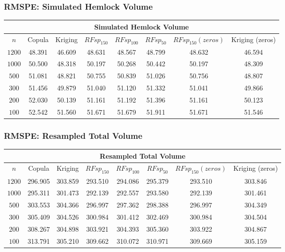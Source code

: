 \documentclass{beamer}
\begin{document}
\begin{frame}
	\frametitle{RMSPE: Simulated Hemlock Volume}
	\begin{center}
		\begin{tabular}{|| c | c c c c c c c ||}
		\hline
		\multicolumn{8}{||c||}{Simulated Hemlock Volume} \\
		\hline
		$n$ & Copula & Kriging & $RFsp_{150}$ & $RFsp_{100}$ & $RFsp_{50}$ & $RFsp_{150}(zeros)$ & Kriging (zeros) \\ [.5ex] 
		\hline\hline
		$1200$ & 48.391 & 46.609 & 48.631 & 48.567 & \cellcolor{gray}48.799 & 48.632 & \cellcolor{cyan}46.594 \\
		$1000$ & \cellcolor{gray}50.500 & 48.318 & 50.197 & 50.268 & 50.442 & 50.197 & \cellcolor{cyan}48.309 \\
		$500$ & \cellcolor{gray}51.081 & 48.821 & 50.755 & 50.839 & 51.026 & 50.756 & \cellcolor{cyan}48.807 \\
		$300$ & \cellcolor{gray}51.456 & 49.879 & 51.040 & 51.120 & 51.332 & 51.041 & \cellcolor{cyan}49.866 \\
		$200$ & \cellcolor{gray}52.030 & 50.139 & 51.161 & 51.192 & 51.396 & 51.161 & \cellcolor{cyan}50.123 \\
		$100$ & \cellcolor{gray}52.542 & 51.560 & 51.671 & 51.679 & 51.911 & 51.671 & \cellcolor{cyan}51.546 \\ [.5ex] 
		\hline
		\end{tabular}
	\end{center}
\end{frame}

\begin{frame}
	\frametitle{RMSPE: Resampled Total Volume}
	\begin{center}
		\begin{tabular}{|| c | c c c c c c c ||}
		\hline
		\multicolumn{8}{||c||}{Resampled Total Volume} \\
		\hline
		$n$ & Copula & Kriging & $RFsp_{150}$ & $RFsp_{100}$ & $RFsp_{50}$ & $RFsp_{150}(zeros)$ & Kriging (zeros) \\ [.5ex] 
		\hline\hline
		$1200$ & 296.905 & \cellcolor{gray}303.859 & \cellcolor{cyan}293.510 & 294.086 & 295.379 & \cellcolor{cyan}293.510 & 303.846 \\
		$1000$ & 295.311 & \cellcolor{gray}301.473 & \cellcolor{cyan}292.139 & 292.557 & 293.580 & \cellcolor{cyan}292.139 & 301.461 \\
		$500$ & 303.553 & \cellcolor{gray}304.366 & \cellcolor{cyan}296.997 & 297.362 & 298.388 & \cellcolor{cyan}296.997 & 304.349 \\
		$300$ & \cellcolor{gray}305.409 & 304.526 & \cellcolor{cyan}300.984 & 301.412 & 302.469 & \cellcolor{cyan}300.984 & 304.504 \\
		$200$ & \cellcolor{gray}308.267 & 304.898 & \cellcolor{cyan}303.921 & 304.393 & 305.360 & 303.922 & 304.867 \\
		$100$ & \cellcolor{gray}313.791 & 305.210 & \cellcolor{cyan}309.662 & 310.072 & 310.971 & 309.669 & 305.159 \\ [.5ex] 
		\hline
		\end{tabular}
	\end{center}
\end{frame}
\end{document}
